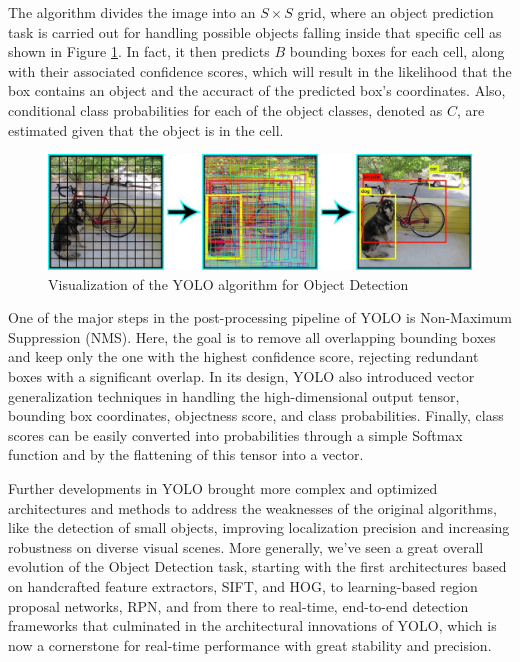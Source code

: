 The algorithm divides the image into an $S \times S$ grid, where an object prediction task is carried out for handling possible objects falling inside that specific cell as shown in Figure \ref{fig:YOLO}. In fact, it then predicts $B$ bounding boxes for each cell, along with their associated confidence scores, which will result in the likelihood that the box contains an object and the accuract of the predicted box's coordinates. Also, conditional class probabilities for each of the object classes, denoted as $C$, are estimated given that the object is in the cell.

\begin{figure}[ht]
    \centering
    \includegraphics[width=1.0\textwidth]{images/YOLO.jpg}
    \caption[YOLO Object Detection]{Visualization of the YOLO algorithm for Object Detection}
    \label{fig:YOLO}
\end{figure}

One of the major steps in the post-processing pipeline of YOLO is Non-Maximum Suppression (NMS). Here, the goal is to remove all overlapping bounding boxes and keep only the one with the highest confidence score, rejecting redundant boxes with a significant overlap. In its design, YOLO also introduced vector generalization techniques in handling the high-dimensional output tensor, bounding box coordinates, objectness score, and class probabilities. Finally, class scores can be easily converted into probabilities through a simple Softmax function and by the flattening of this tensor into a vector.

Further developments in YOLO brought more complex and optimized architectures and methods to address the weaknesses of the original algorithms, like the detection of small objects, improving localization precision and increasing robustness on diverse visual scenes. More generally, we've seen a great overall evolution of the Object Detection task, starting with the first architectures based on handcrafted feature extractors, SIFT, and HOG, to learning-based region proposal networks, RPN, and from there to real-time, end-to-end detection frameworks that culminated in the architectural innovations of YOLO, which is now a cornerstone for real-time performance with great stability and precision. 

